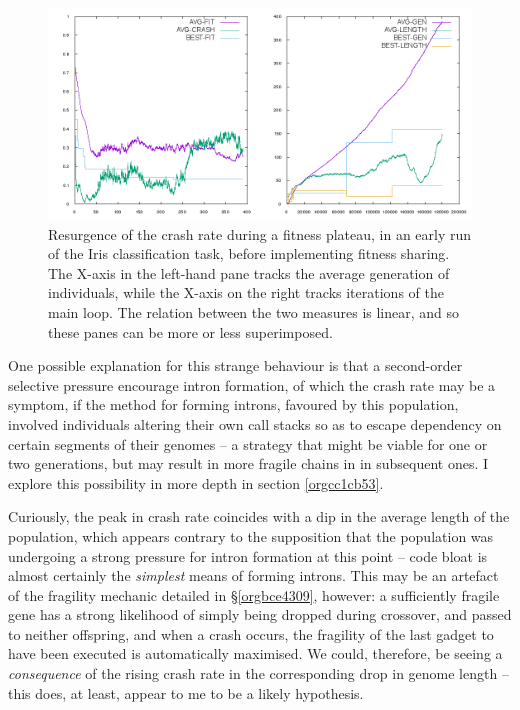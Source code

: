 \documentclass[12pt,glossary]{dalthesis}
\begin{document}
\begin{figure}[htbp]
\centering
\includegraphics[width=.9\linewidth]{../images/plots/good-nosharing.png}
\caption{\label{fig:orgce06fe6}
Resurgence of the crash rate during a fitness plateau, in an early run of the Iris classification task, before implementing fitness sharing. The X-axis in the left-hand pane tracks the average generation of individuals, while the X-axis on the right tracks iterations of the main loop. The relation between the two measures is linear, and so these panes can be more or less superimposed.}
\end{figure}

One possible explanation for this strange behaviour is that a second-order selective
pressure encourage intron formation, of which the crash rate may be a symptom,
if the method for forming introns, favoured by this population, involved individuals
altering their own call stacks so as to escape dependency on certain segments of their
genomes -- a strategy that might be viable for one or two generations, but may result
in more fragile chains in in subsequent ones. I explore this possibility in more
depth in section \ref{orgcc1cb53}.

Curiously, the peak in crash rate coincides with a dip in the average length of the
population, which appears contrary to the supposition that the population was undergoing
a strong pressure for intron formation at this point -- code bloat is almost certainly
the \emph{simplest} means of forming introns. This may be an artefact of the fragility
mechanic detailed in \S \ref{orgbce4309}, however: a sufficiently fragile gene
has a strong likelihood of simply being dropped during crossover, and passed to neither
offspring, and when a crash occurs, the fragility of the last gadget to have been
executed is automatically maximised. We could, therefore, be seeing a \emph{consequence}
of the rising crash rate in the corresponding drop in genome length -- this does, at
least, appear to me to be a likely hypothesis.
\end{document}
